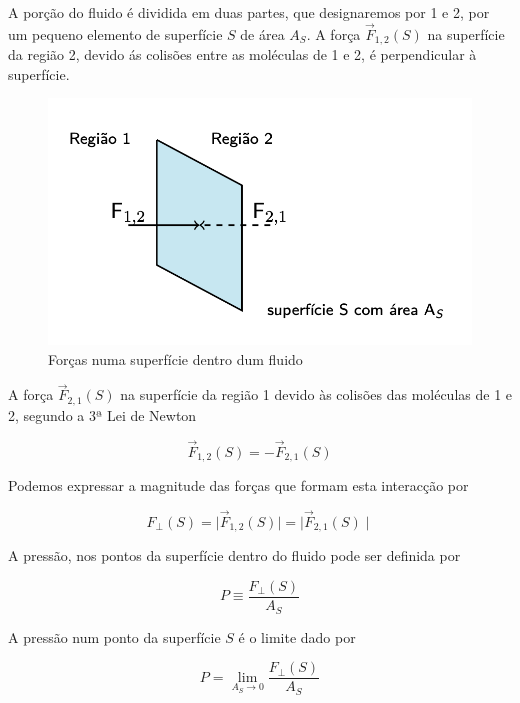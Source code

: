 \documentclass[
  portuguese,
  ]{book}
\begin{document}
A porção do fluido é dividida em duas partes, que designaremos por 1 e 2, por um pequeno elemento de superfície \(S\) de área \(A_S\). A força \(\vec{F}_{1,2}(S)\) na superfície da região 2, devido ás colisões entre as moléculas de 1 e 2, é perpendicular à superfície.

\begin{figure}

{\centering \includegraphics[width=0.7\linewidth]{img/hidros_1} 

}

\caption{Forças numa superfície dentro dum fluido}\label{fig:imghidros1}
\end{figure}

A força \(\vec{F}_{2,1}(S)\) na superfície da região 1 devido às colisões das moléculas de 1 e 2, segundo a 3ª Lei de Newton

\begin{equation}
\vec{F}_{1,2}(S)=-\vec{F}_{2,1}(S)
\label{eq:hidros1}
\end{equation}

Podemos expressar a magnitude das forças que formam esta interacção por

\begin{equation}
F_{\perp}(S)=\mid\vec{F}_{1,2}(S)\mid=\mid\vec{F}_{2,1}(S)\mid
\label{eq:hidros2}
\end{equation}

A pressão, nos pontos da superfície dentro do fluido pode ser definida por

\begin{equation}
P\equiv \frac{F_{\perp}(S)}{A_S}
\label{eq:hidros3}
\end{equation}

A pressão num ponto da superfície \(S\) é o limite dado por

\begin{equation}
P=\lim_{A_S \to 0}\frac{F_{\perp}(S)}{A_S}
\label{eq:hidros4}
\end{equation}
\end{document}
